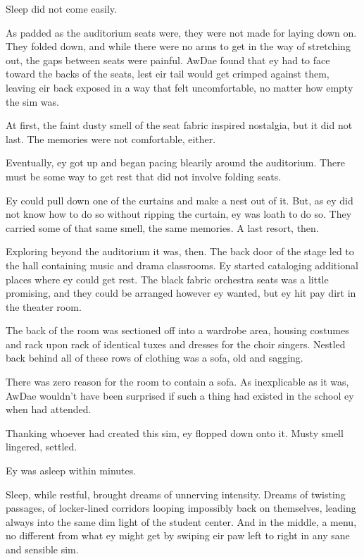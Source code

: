 Sleep did not come easily.

As padded as the auditorium seats were, they were not made for laying down on. They folded down, and while there were no arms to get in the way of stretching out, the gaps between seats were painful. AwDae found that ey had to face toward the backs of the seats, lest eir tail would get crimped against them, leaving eir back exposed in a way that felt uncomfortable, no matter how empty the sim was.

At first, the faint dusty smell of the seat fabric inspired nostalgia, but it did not last. The memories were not comfortable, either.

Eventually, ey got up and began pacing blearily around the auditorium. There must be some way to get rest that did not involve folding seats.

Ey could pull down one of the curtains and make a nest out of it. But, as ey did not know how to do so without ripping the curtain, ey was loath to do so. They carried some of that same smell, the same memories. A last resort, then.

Exploring beyond the auditorium it was, then. The back door of the stage led to the hall containing music and drama classrooms. Ey started cataloging additional places where ey could get rest. The black fabric orchestra seats was a little promising, and they could be arranged however ey wanted, but ey hit pay dirt in the theater room.

The back of the room was sectioned off into a wardrobe area, housing costumes and rack upon rack of identical tuxes and dresses for the choir singers. Nestled back behind all of these rows of clothing was a sofa, old and sagging.

There was zero reason for the room to contain a sofa. As inexplicable as it was, AwDae wouldn't have been surprised if such a thing had existed in the school ey when had attended.

Thanking whoever had created this sim, ey flopped down onto it. Musty smell lingered, settled.

Ey was asleep within minutes.

Sleep, while restful, brought dreams of unnerving intensity. Dreams of twisting passages, of locker-lined corridors looping impossibly back on themselves, leading always into the same dim light of the student center. And in the middle, a menu, no different from what ey might get by swiping eir paw left to right in any sane and sensible sim.

